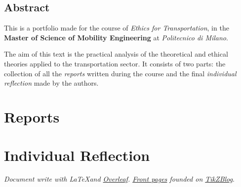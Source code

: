 \documentclass{report}
\begin{document}

\newpage
\chapter*{Abstract}
\begin{center}
This is a portfolio made for the course of \textit{Ethics for Transportation}, in the \textbf{Master of Science of Mobility Engineering} at \textit{Politecnico di Milano}.

The aim of this text is the practical analysis of the theoretical and ethical theories applied to the transportation sector. It consists of two parts: the collection of all the \textit{reports} written during the course and the final \textit{individual reflection} made by the authors.
\end{center}

\tableofcontents
{}

\part{Reports}

\newpage

\newpage

\newpage
{}

\newpage

\newpage

\newpage
\part{Individual Reflection}





\newpage
\listoffigures
{}
\printbibliography[heading=bibintoc]
\nocite{*}
\centering
\textit{Document write with \LaTeX \:and \href{www.overleaf.com}{Overleaf}. \href{https://www.overleaf.com/docs?snip_uri=https://github.com/tikz-examples/LatexGraphics/raw/master/CoverPage1.tex}{Front pages} founded on \href{https://latexdraw.com/tikz-cover-pages-gallery/}{TikZBlog}}.
\end{document}
